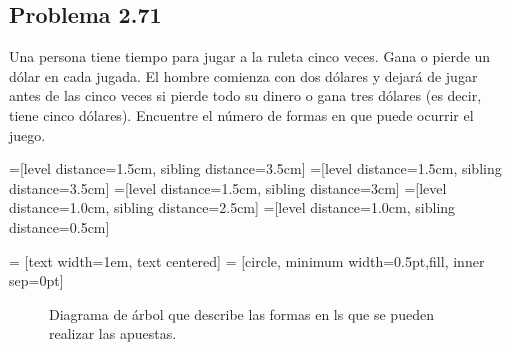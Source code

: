 \subsection*{Problema 2.71}
Una persona tiene tiempo para jugar a la ruleta cinco veces. Gana o pierde un
dólar en cada jugada. El hombre comienza con dos dólares y dejará de jugar antes
de las cinco veces si pierde todo su dinero o gana tres dólares (es decir, tiene
cinco dólares). Encuentre el número de formas en que puede ocurrir el juego.

=[level distance=1.5cm, sibling distance=3.5cm]
=[level distance=1.5cm, sibling distance=3.5cm]
=[level distance=1.5cm, sibling distance=3cm]
=[level distance=1.0cm, sibling distance=2.5cm]
=[level distance=1.0cm, sibling distance=0.5cm]

 = [text width=1em, text centered]
 = [circle, minimum width=0.5pt,fill, inner sep=0pt]

\begin{figure}[h]
    \centering
{}
\caption{Diagrama de árbol que describe las formas en ls que se pueden realizar
las apuestas.}
\end{figure}



